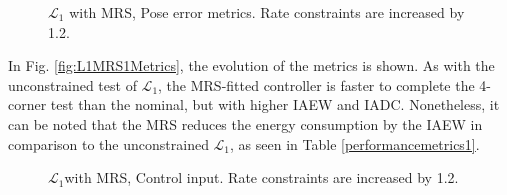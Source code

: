 \begin{figure}[!h]
    \centering
    \caption{ $\mathcal{L}_1$ with MRS, Pose error metrics. Rate constraints are increased by 1.2. }
\end{figure}\label{fig:L1MRS1Metrics}

In Fig. \ref{fig:L1MRS1Metrics}, the evolution of the metrics is shown. As with the unconstrained test of $\mathcal{L}_1$, the MRS-fitted controller is faster to complete the 4-corner test than the nominal, but with higher IAEW and IADC. Nonetheless, it can be noted that the MRS reduces the energy consumption by the IAEW in comparison to the unconstrained $\mathcal{L}_1$, as seen in Table \ref{performancemetrics1}. 

\begin{figure}[!h]
    \centering
    \caption{ $\mathcal{L}_1$with MRS, Control input. Rate constraints are increased by 1.2. }
\end{figure}\label{fig:L1MRS1tau}

